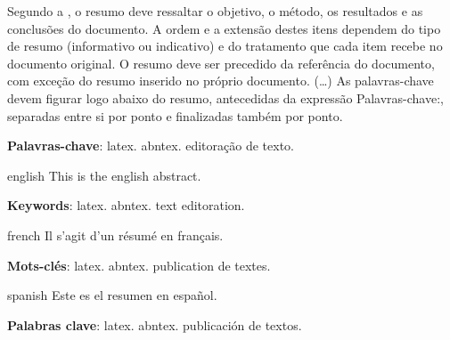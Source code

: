 \documentclass[
	12pt,				%
	openright,			%
    twoside,			%
	a4paper,			%
	english,			%
	french,				%
	spanish,			%
	brazil				%
	]{abntex2}
\numberwithin{lema}{chapter}
\numberwithin{teorema}{chapter}
\numberwithin{definicao}{chapter}
\numberwithin{figure}{chapter}
\begin{document}
\setlength{\absparsep}{18pt} %
\begin{resumo}[RESUMO]
 Segundo a , o resumo deve ressaltar o
 objetivo, o método, os resultados e as conclusões do documento. A ordem e a extensão
 destes itens dependem do tipo de resumo (informativo ou indicativo) e do
 tratamento que cada item recebe no documento original. O resumo deve ser
 precedido da referência do documento, com exceção do resumo inserido no
 próprio documento. (\ldots) As palavras-chave devem figurar logo abaixo do
 resumo, antecedidas da expressão Palavras-chave:, separadas entre si por
 ponto e finalizadas também por ponto.

 \textbf{Palavras-chave}: latex. abntex. editoração de texto.
\end{resumo}

\begin{resumo}[Abstract]
 \begin{otherlanguage*}{english}
   This is the english abstract.

   \vspace{\onelineskip}
 
   \noindent 
   \textbf{Keywords}: latex. abntex. text editoration.
 \end{otherlanguage*}
\end{resumo}

\begin{resumo}[Résumé]
 \begin{otherlanguage*}{french}
    Il s'agit d'un résumé en français.
 
   \textbf{Mots-clés}: latex. abntex. publication de textes.
 \end{otherlanguage*}
\end{resumo}

\begin{resumo}[Resumen]
 \begin{otherlanguage*}{spanish}
   Este es el resumen en español.
  
   \textbf{Palabras clave}: latex. abntex. publicación de textos.
 \end{otherlanguage*}
\end{resumo}

\listoffigures*
\cleardoublepage

\listoftables*
\cleardoublepage
\end{document}

